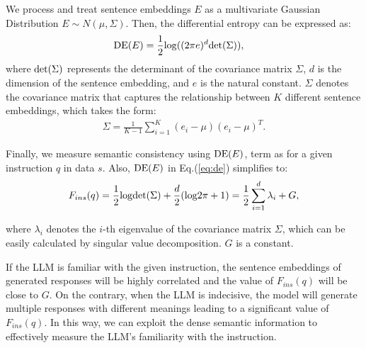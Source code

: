 We process and treat sentence embeddings $E$ as a multivariate Gaussian Distribution $E\sim N(\mu, \Sigma)$.
Then, the differential entropy can be expressed as:
\begin{align}
\label{eq:de}
{\rm DE}(E) &= \frac{1}{2}{\rm log}((2\pi e)^d{\rm det} (\Sigma)),
\end{align}
where ${\rm det}(\Sigma)$ represents the determinant of the covariance matrix $\Sigma$, $d$ is the dimension of the sentence embedding, and $e$ is the natural constant.
$\Sigma$ denotes the covariance matrix that captures the relationship between $K$ different sentence embeddings, which takes the form:
\begin{align}
\Sigma = \frac{1}{K-1} \sum_{i=1}^{K}(e_i-\mu)(e_i-\mu)^T.
\end{align}

Finally, we measure semantic consistency using ${\rm DE}(E)$, term as  for a given instruction $q$ in data $s$.
Also, ${\rm DE}(E)$ in Eq.(\ref{eq:de}) simplifies to:
{
\small
\begin{align}
\label{eq:de_final}
F_{ins}(q) = \frac{1}{2}{\rm log}{\rm det}(\Sigma) + \frac{d}{2}({\rm log}2\pi+1) = \frac{1}{2}\sum_{i=1}^{d}\lambda_i + G,
\end{align}
}

\noindent
where $\lambda_i$ denotes the $i$-th eigenvalue of the covariance matrix $\Sigma$, which can be easily calculated by singular value decomposition.
$G$ is a constant.

If the LLM is familiar with the given instruction, the sentence embeddings of generated responses will be highly correlated and the value of $F_{ins}(q)$ will be close to $G$.
On the contrary, when the LLM is indecisive, the model will generate multiple responses with different meanings leading to a significant value of $F_{ins}(q)$. 
In this way, we can exploit the dense semantic information to effectively measure the LLM’s familiarity with the instruction.


